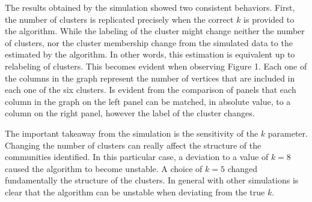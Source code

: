 \documentclass[11pt,letter]{article}%
\numberwithin{equation}{section}
\begin{document}
The results obtained by the simulation showed two consistent behaviors. First, the number of clusters is replicated precisely when the correct $k$ is provided to the algorithm. While the labeling of the cluster might change neither the number of clusters, nor the cluster membership change from the simulated data to the estimated by the algorithm. In other words, this estimation is equivalent up to relabeling of clusters. This becomes evident when observing Figure 1. Each one of the columns in the graph represent the number of vertices that are included in each one of the six clusters. Is evident from the comparison of panels that each column in the graph on the left panel can be matched, in absolute value, to a column on the right panel, however the label of the cluster changes.

The important takeaway from the simulation is the sensitivity of the $k$ parameter. Changing the number of clusters can really affect the structure of the communities identified. In this particular case, a deviation to a value of $k=8$ caused the  algorithm to become unstable. A choice of $k=5$ changed fundamentally the structure of the clusters. In general with other simulations is clear that the algorithm can be unstable when deviating from the true $k$. 
\end{document}
